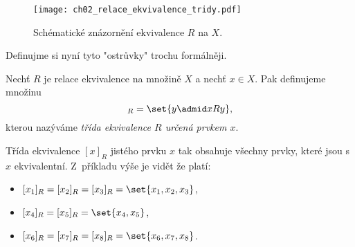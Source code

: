 \begin{figure}[H]
    \centering
    \texttt{[image: ch02\_relace\_ekvivalence\_tridy.pdf]}
    \caption{Schématické znázornění ekvivalence $R$ na $X$.}
    \label{fig:relace_ekvivalence_tridy}
\end{figure}
Definujme si nyní tyto "ostrůvky" trochu formálněji.
\begin{definition}
    Nechť $R$ je relace ekvivalence na množině $X$ a nechť $x\in X$. Pak definujeme množinu
    \begin{equation*}
        [x]_R=\set{y \admid xRy},
    \end{equation*}
    kterou nazýváme \emph{třída ekvivalence $R$ určená prvkem $x$}.
\end{definition}
Třída ekvivalence $[x]_R$ jistého prvku $x$ tak obsahuje všechny prvky, které jsou s~$x$ ekvivalentní. Z~příkladu výše je vidět že platí:
\begin{itemize}
    \item $[x_1]_R=[x_2]_R=[x_3]_R=\set{x_1,x_2,x_3}$,
    \item $[x_4]_R=[x_5]_R=\set{x_4,x_5}$,
    \item $[x_6]_R=[x_7]_R=[x_8]_R=\set{x_6,x_7,x_8}$.
\end{itemize}
